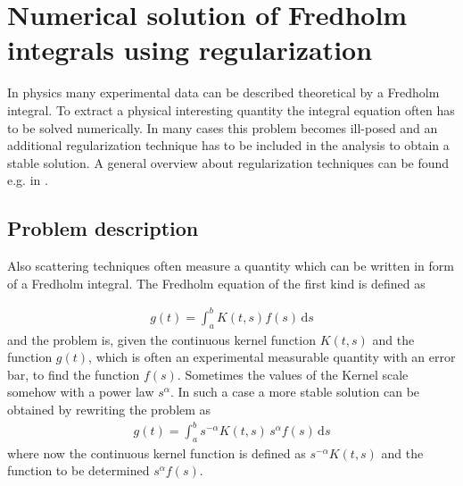 \chapter{Numerical solution of Fredholm integrals using regularization}
In physics many experimental data can be described theoretical by a Fredholm integral. To extract a physical interesting quantity the integral equation often has to be solved numerically. In many cases this problem becomes ill-posed and an additional regularization technique has to be included in the analysis to obtain a stable solution. A general overview about regularization techniques can be found e.g. in \cite{Hansen1998,Hansen2000b,Gazzola2018,Scherzer2011,Kern2016}.


\section{Problem description}
Also scattering techniques often measure  a quantity which can be written in form of a Fredholm integral.
The Fredholm equation of the first kind is defined as

\begin{align}
\label{eq:Fredholm}
g(t)=\int _{a}^{b}K(t,s)f(s)\,\mathrm {d} s
\end{align}
and the problem is, given the continuous kernel function $K(t,s)$ and the function $g(t)$, which is often an experimental measurable quantity with an error bar, to find the function $f(s)$. Sometimes the values of the Kernel scale somehow with a power law $s^\alpha$. In such a case a more stable solution can be obtained by rewriting the problem as
\begin{align}
\label{eq:KernelScaling}
g(t)=\int _{a}^{b}s^{-\alpha} K(t,s) \, s^{\alpha}f(s)\,\mathrm {d} s
\end{align}
where now the continuous kernel function is defined as $s^{-\alpha}K(t,s)$ and the function to be determined $s^{\alpha} f(s)$.

